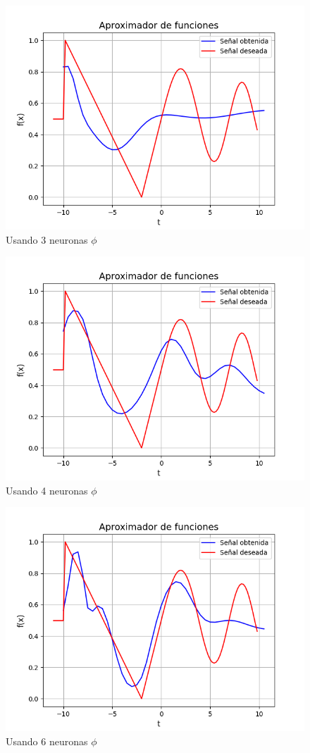 \documentclass[
	11pt, %
]{beamer}
\begin{document}
\begin{frame}
  \begin{figure}
    \caption{Usando 3 neuronas $\phi$}
    \includegraphics[width=0.6\linewidth]{3neuronas.png}
  \end{figure}
\end{frame}

\begin{frame}
  \begin{figure}
    \caption{Usando 4 neuronas $\phi$}
    \includegraphics[width=0.6\linewidth]{4neuronas.png}
  \end{figure}
\end{frame}

\begin{frame}
  \begin{figure}
    \caption{Usando 6 neuronas $\phi$}
    \includegraphics[width=0.6\linewidth]{6neuronas.png}
  \end{figure}
\end{frame}
\end{document}
